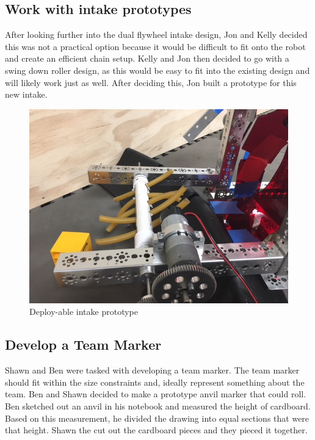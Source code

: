 \documentclass{article}
\newif\ifcontents
\begin{document}
\contentsfalse

\subsection{Work with intake prototypes}
After looking further into the dual flywheel intake design, Jon and Kelly decided this was not a practical option because it would be difficult to fit onto the robot and create an efficient chain setup. Kelly and Jon then decided to go with a swing down roller design, as this would be easy to fit into the existing design and will likely work just as well. After deciding this, Jon built a prototype for this new intake. 

\begin{figure}
    \centering
    \includegraphics[width=.6\textwidth]{03_09-17/images/IMG_0262.JPG}
    \caption{Deploy-able intake prototype}
    \label{fig:my_label}
\end{figure}

\subsection{Develop a Team Marker}
Shawn and Ben were tasked with developing a team marker. The team marker should fit within the size constraints and, ideally represent something about the team. Ben and Shawn decided to make a prototype anvil marker that could roll. Ben sketched out an anvil in his notebook and measured the height of cardboard. Based on this measurement, he divided the drawing into equal sections that were that height. Shawn the cut out the cardboard pieces and they pieced it together.
\end{document}
